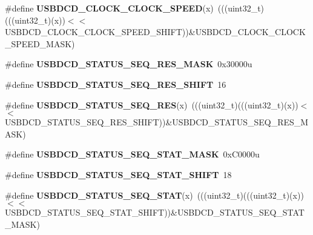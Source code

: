 \begin{DoxyCompactItemize}
\item 
\#define {\bfseries U\+S\+B\+D\+C\+D\+\_\+\+C\+L\+O\+C\+K\+\_\+\+C\+L\+O\+C\+K\+\_\+\+S\+P\+E\+ED}(x)~(((uint32\+\_\+t)(((uint32\+\_\+t)(x))$<$$<$U\+S\+B\+D\+C\+D\+\_\+\+C\+L\+O\+C\+K\+\_\+\+C\+L\+O\+C\+K\+\_\+\+S\+P\+E\+E\+D\+\_\+\+S\+H\+I\+FT))\&U\+S\+B\+D\+C\+D\+\_\+\+C\+L\+O\+C\+K\+\_\+\+C\+L\+O\+C\+K\+\_\+\+S\+P\+E\+E\+D\+\_\+\+M\+A\+SK)\hypertarget{group__USBDCD__Register__Masks_gadaafc909e148543c71cfd927b757be98}{}\label{group__USBDCD__Register__Masks_gadaafc909e148543c71cfd927b757be98}

\item 
\#define {\bfseries U\+S\+B\+D\+C\+D\+\_\+\+S\+T\+A\+T\+U\+S\+\_\+\+S\+E\+Q\+\_\+\+R\+E\+S\+\_\+\+M\+A\+SK}~0x30000u\hypertarget{group__USBDCD__Register__Masks_gaa1c55980f5e31bfe02a2f4bc3bcf753d}{}\label{group__USBDCD__Register__Masks_gaa1c55980f5e31bfe02a2f4bc3bcf753d}

\item 
\#define {\bfseries U\+S\+B\+D\+C\+D\+\_\+\+S\+T\+A\+T\+U\+S\+\_\+\+S\+E\+Q\+\_\+\+R\+E\+S\+\_\+\+S\+H\+I\+FT}~16\hypertarget{group__USBDCD__Register__Masks_ga4d1d707ac9f9afb0b114a4032951971d}{}\label{group__USBDCD__Register__Masks_ga4d1d707ac9f9afb0b114a4032951971d}

\item 
\#define {\bfseries U\+S\+B\+D\+C\+D\+\_\+\+S\+T\+A\+T\+U\+S\+\_\+\+S\+E\+Q\+\_\+\+R\+ES}(x)~(((uint32\+\_\+t)(((uint32\+\_\+t)(x))$<$$<$U\+S\+B\+D\+C\+D\+\_\+\+S\+T\+A\+T\+U\+S\+\_\+\+S\+E\+Q\+\_\+\+R\+E\+S\+\_\+\+S\+H\+I\+FT))\&U\+S\+B\+D\+C\+D\+\_\+\+S\+T\+A\+T\+U\+S\+\_\+\+S\+E\+Q\+\_\+\+R\+E\+S\+\_\+\+M\+A\+SK)\hypertarget{group__USBDCD__Register__Masks_gaeec86c1cd7a042be608295688f38d243}{}\label{group__USBDCD__Register__Masks_gaeec86c1cd7a042be608295688f38d243}

\item 
\#define {\bfseries U\+S\+B\+D\+C\+D\+\_\+\+S\+T\+A\+T\+U\+S\+\_\+\+S\+E\+Q\+\_\+\+S\+T\+A\+T\+\_\+\+M\+A\+SK}~0x\+C0000u\hypertarget{group__USBDCD__Register__Masks_gad49d469540afee62a5a62a5419d89cf2}{}\label{group__USBDCD__Register__Masks_gad49d469540afee62a5a62a5419d89cf2}

\item 
\#define {\bfseries U\+S\+B\+D\+C\+D\+\_\+\+S\+T\+A\+T\+U\+S\+\_\+\+S\+E\+Q\+\_\+\+S\+T\+A\+T\+\_\+\+S\+H\+I\+FT}~18\hypertarget{group__USBDCD__Register__Masks_ga8e3d04ac9b5b6195f765f29f82264376}{}\label{group__USBDCD__Register__Masks_ga8e3d04ac9b5b6195f765f29f82264376}

\item 
\#define {\bfseries U\+S\+B\+D\+C\+D\+\_\+\+S\+T\+A\+T\+U\+S\+\_\+\+S\+E\+Q\+\_\+\+S\+T\+AT}(x)~(((uint32\+\_\+t)(((uint32\+\_\+t)(x))$<$$<$U\+S\+B\+D\+C\+D\+\_\+\+S\+T\+A\+T\+U\+S\+\_\+\+S\+E\+Q\+\_\+\+S\+T\+A\+T\+\_\+\+S\+H\+I\+FT))\&U\+S\+B\+D\+C\+D\+\_\+\+S\+T\+A\+T\+U\+S\+\_\+\+S\+E\+Q\+\_\+\+S\+T\+A\+T\+\_\+\+M\+A\+SK)\hypertarget{group__USBDCD__Register__Masks_gaa4db555b4aa4832902a32703f86116ea}{}\label{group__USBDCD__Register__Masks_gaa4db555b4aa4832902a32703f86116ea}


\end{DoxyCompactItemize}

